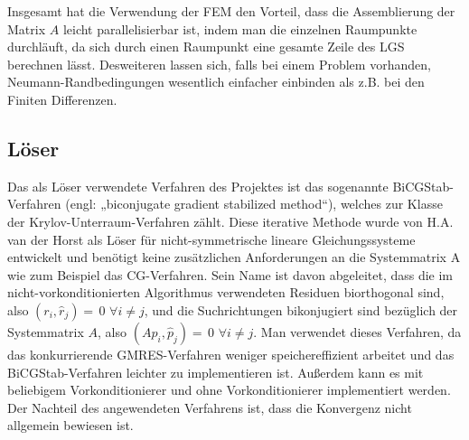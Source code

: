 Insgesamt hat die Verwendung der FEM den Vorteil, dass die Assemblierung der Matrix $A$ leicht parallelisierbar ist, indem man die einzelnen Raumpunkte durchläuft, da sich durch einen Raumpunkt eine gesamte Zeile des LGS berechnen lässt. Desweiteren lassen sich, falls bei einem Problem vorhanden, Neumann-Randbedingungen wesentlich einfacher einbinden als z.B. bei den Finiten Differenzen. 


\subsection{Löser}
Das als Löser verwendete Verfahren des Projektes ist das sogenannte BiCGStab-\newline Verfahren (engl: „biconjugate gradient stabilized method“), welches zur Klasse der Krylov-Unterraum-Verfahren zählt. Diese iterative Methode wurde von H.A. van der Horst als Löser für nicht-symmetrische lineare Gleichungssysteme entwickelt und benötigt keine zusätzlichen Anforderungen an die Systemmatrix A wie zum Beispiel das CG-Verfahren. Sein Name ist davon abgeleitet, dass die im nicht-vorkonditionierten Algorithmus verwendeten Residuen biorthogonal sind, also $(r_i,\hat{r}_j)=\,0$ $\forall i\neq j$, und die Suchrichtungen bikonjugiert sind bezüglich der Systemmatrix $A$, also $(Ap_i,\hat{p}_j)=\,0$ $ \forall i \neq j$.  Man verwendet dieses Verfahren, da das konkurrierende GMRES-Verfahren weniger speichereffizient arbeitet und das BiCGStab-Verfahren leichter zu implementieren ist.  Au\ss{}erdem kann es mit beliebigem Vorkonditionierer und ohne Vorkonditionierer implementiert werden. Der Nachteil des angewendeten Verfahrens ist, dass die Konvergenz nicht allgemein bewiesen ist.  \\



